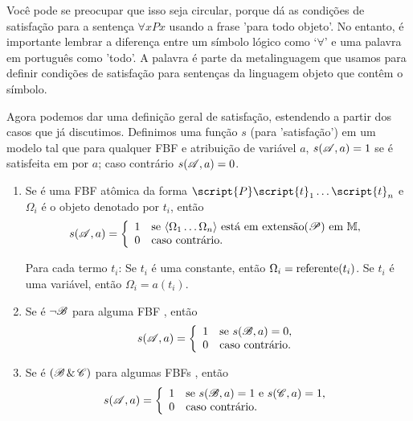 Você pode se preocupar que isso seja circular, porque dá as condições de satisfação para a sentença $\forall x Px$ usando a frase 'para todo objeto'. No entanto, é importante lembrar a diferença entre um símbolo lógico como `$\forall$' e uma palavra em português como 'todo'. A palavra é parte da metalinguagem que usamos para definir condições de satisfação para sentenças da linguagem objeto que contêm o símbolo.

Agora podemos dar uma definição geral de satisfação, estendendo a partir dos casos que já discutimos. Definimos uma função $s$ (para 'satisfação') em um modelo  tal que para qualquer FBF  e atribuição de variável $a$, $s(\script{A}, a)=1$ se  é satisfeita em  por $a$; caso contrário $s(\script{A}, a)=0$.

\begin{enumerate}
\item Se  é uma FBF atômica da forma $\script{P}\script{t}_1\ldots\script{t}_n$ e $\Omega_i$ é o objeto denotado por $t_i$, então
\begin{displaymath}s(\script{A}, a) =
	\left\{\begin{array}{ll}
	1 & \mbox{se ${\langle}\Omega_1\ldots\Omega_n{\rangle}$ está em \extension{\script{P}} em \model{M}},\\
	0 & \mbox{caso contrário.}
	\end{array}\right.
\end{displaymath}

Para cada termo $t_i$: Se $t_i$ é uma constante, então $\Omega_i = \referent{t_i}$. Se $t_i$ é uma variável, então $\Omega_i = a(t_i)$.

\item Se  é ${\enot}\script{B}$ para alguma FBF , então
\begin{displaymath}s(\script{A}, a) =
	\left\{\begin{array}{ll}
	1 & \mbox{se $s(\script{B}, a) = 0$},\\
	0 & \mbox{caso contrário.}
	\end{array}\right.
\end{displaymath}

\item Se  é $(\script{B}\eand\script{C})$ para algumas FBFs , então
\begin{displaymath}s(\script{A}, a) =
	\left\{\begin{array}{ll}
	1 & \mbox{se $s(\script{B}, a) = 1$ e $s(\script{C}, a) = 1$,}\\
	0 & \mbox{caso contrário.}
	\end{array}\right.
\end{displaymath}


\end{enumerate}
